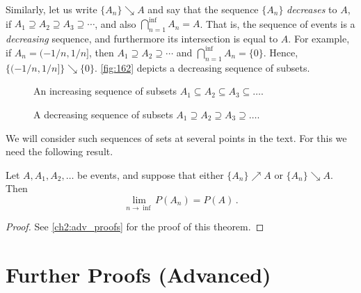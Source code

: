 Similarly, let us write $\{A_n\}\searrow A$ and say that the sequence $\{A_n\}$ \emph{decreases} to $A$, if $A_1\supseteq A_2\supseteq A_3 \supseteq\cdots$, and also $\bigcap_{n=1}^{\inf}A_n=A$. That is, the sequence of events is a \emph{decreasing} sequence, and furthermore its intersection is equal to $A$. For example, if $A_n=(-1/n,1/n]$, then $A_1\supseteq A_2 \supseteq \cdots$ and $\bigcap_{n=1}^{\inf}A_n=\{0\}$. Hence, $\{(-1/n,1/n]\}\searrow\{0\}$. \autoref{fig:162} depicts a decreasing sequence of subsets.
\begin{figure}
    \caption{An increasing sequence of subsets $A_1\subseteq A_2 \subseteq A_3 \subseteq \dots$.\label{fig:161}}
\end{figure}
\begin{figure}
    \caption{A decreasing sequence of subsets $A_1 \supseteq A_2 \supseteq A_3 \supseteq \dots$.\label{fig:162}}
\end{figure}
We will consider such sequences of sets at several points in the text. For this we need the following result.
\begin{theorem}
    Let $A,A_1, A_2, \ldots$ be events, and suppose that either $\{A_n\}\nearrow A$ or $\{A_n\}\searrow A$. Then
    $$
    \lim_{n\to\inf}P(A_n)=P(A)\,.
    $$
\end{theorem}
\begin{proof}
    See \autoref{ch2:adv_proofs} for the proof of this theorem.
\end{proof}
\section{Further Proofs (Advanced)}\label{ch2:adv_proofs}
\lipsum
